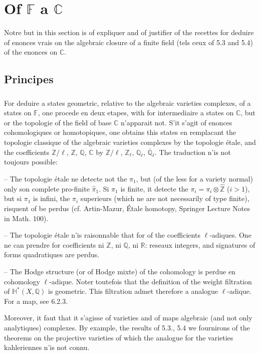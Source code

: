 \documentclass[12pt,a4paper]{article}
\theoremstyle{plain}
\theoremstyle{definition}
\theoremstyle{remark}
\newcommand{\CC}{\mathbb{C}}
\newcommand{\FF}{\mathbb{F}}
\newcommand{\HH}{\mathbb{H}}
\newcommand{\QQ}{\mathbb{Q}}
\newcommand{\RR}{\mathbb{R}}
\newcommand{\ZZ}{\mathbb{Z}}
\begin{document}
\section{Of $\FF$ a $\CC$}

Notre but in this section is of expliquer and of justifier of the recettes for deduire of enonces vrais on the algebraic closure of a finite field (tels ceux of 5.3 and 5.4) of the enonces on $\CC$.

\subsection{Principes}

\subsubsection{}
For deduire a states geometric, relative to the algebraic varieties complexes, of a states on $\FF$, one procede en deux etapes, with for intermediaire a states on $\CC$, but or the topologie of the field of base $\CC$ n'apparait not. S'it s'agit of enonces cohomologiques or homotopiques, one obtains this states en remplacant the topologie classique of the algebraic varieties complexes by the topologie étale, and the coefficients $\ZZ/\ell$, $\ZZ$, $\QQ$, $\CC$ by $\ZZ/\ell$, $\ZZ_{\ell}$, $\QQ_{\ell}$, $\overline{\QQ}_{\ell}$. The traduction n'is not toujours possible:

-- The topologie étale ne detecte not the $\pi_1$, but (of the less for a variety normal) only son complete pro-finite $\hat{\pi}_1$. Si $\pi_1$ is finite, it detecte the $\pi_i = \pi_i \otimes \hat{\ZZ}$ ($i > 1$), but si $\pi_1$ is infini, the $\pi_i$ superieurs (which ne are not necessarily of type finite), risquent of be perdus (cf. Artin-Mazur, Étale homotopy, Springer Lecture Notes in Math. 100).

-- The topologie étale n'is raisonnable that for of the coefficients $\ell$-adiques. One ne can prendre for coefficients ni $\ZZ$, ni $\QQ$, ni $\RR$: reseaux integers, and signatures of forms quadratiques are perdus.

-- The Hodge structure (or of Hodge mixte) of the cohomology is perdue en cohomology $\ell$-adique. Noter toutefois that the definition of the weight filtration of $\HH^*(X, \QQ)$ is geometric. This filtration admet therefore a analogue $\ell$-adique. For a map, see 6.2.3.

Moreover, it faut that it s'agisse of varieties and of maps algebraic (and not only analytiques) complexes. By example, the results of 5.3., 5.4 we fournirons of the theorems on the projective varieties of which the analogue for the varieties kahleriennes n'is not connu.
\end{document}
